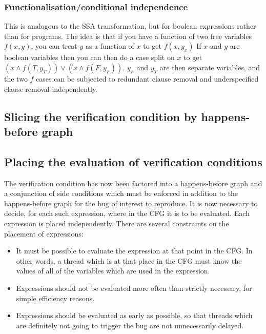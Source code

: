 \subsubsection{Functionalisation/conditional independence}

This is analogous to the SSA transformation, but for boolean expressions rather than for programs.
The idea is that if you have a function of two free variables $f(x, y)$, you can treat $y$ as a function of $x$ to get $f(x, y_x)$
If $x$ and $y$ are boolean variables then you can then do a case split on $x$ to get $(x \wedge f(T, y_T)) \vee (\not{}x \wedge f(F, y_F))$.
$y_F$ and $y_T$ are then separate variables, and the two $f$ cases can be subjected to redundant clause removal and underspecified clause removal independently.





\subsection{Slicing the verification condition by happens-before graph}
\label{sect:enforce:slice_hb_graph}

\subsection{Placing the evaluation of verification conditions}
\label{sect:enforce:place_vcs}
The verification condition has now been factored into a happens-before
graph and a conjunction of side conditions which must be enforced in
addition to the happens-before graph for the bug of interest to
reproduce.  It is now necessary to decide, for each such expression,
where in the CFG it is to be evaluated.  Each expression is placed
independently.  There are several constraints on the placement of
expressions:

\begin{itemize}
\item
  It must be possible to evaluate the expression at that point in the CFG.
  In other words, a thread which is at that place in the CFG must know the values of all of the variables which are used in the expression.
\item
  Expressions should not be evaluated more often than strictly necessary, for simple efficiency reasons.
\item
  Expressions should be evaluated as early as possible, so that threads which are definitely not going to trigger the bug are not unnecessarily delayed.
\end{itemize}

